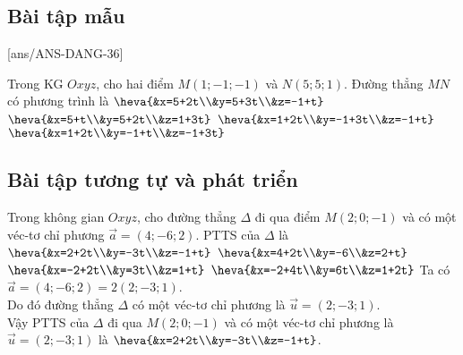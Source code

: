 \subsection{Bài tập mẫu}
[ans/ANS-DANG-36]
\begin{khung}
	\begin{vd}%
Trong KG $Oxyz$, cho hai điểm $M(1;-1;-1)$ và $N(5;5;1)$. Đường thẳng $MN$ có phương trình là
		\choice
		{$\heva{&x=5+2t\\&y=5+3t\\&z=-1+t}$}	
		{$\heva{&x=5+t\\&y=5+2t\\&z=1+3t}$}
		{\True $\heva{&x=1+2t\\&y=-1+3t\\&z=-1+t}$}	
		{$\heva{&x=1+2t\\&y=-1+t\\&z=-1+3t}$}
	\end{vd}
\end{khung}
\subsection{Bài tập tương tự và phát triển}
\begin{ex}%
	Trong không gian $O x y z$, cho đường thẳng $\Delta$ đi qua điểm $M(2;0;-1)$ và có một véc-tơ chỉ phương $\vec{a}=(4;-6;2)$. PTTS của $\Delta$ là 
	\choice 
	{\True $\heva{&x=2+2t\\&y=-3t\\&z=-1+t}$}
	{$\heva{&x=4+2t\\&y=-6\\&z=2+t}$}
	{$\heva{&x=-2+2t\\&y=3t\\&z=1+t}$}
	{$\heva{&x=-2+4t\\&y=6t\\&z=1+2t}$}
					\loigiai 
					{
Ta có $\vec{a}=(4;-6;2)=2(2;-3;1)$.\\
Do đó đường thẳng $\Delta$ có một véc-tơ chỉ phương là $\vec{u}=(2;-3;1)$.\\
Vậy PTTS của $\Delta$ đi qua $M(2;0;-1)$ và có một véc-tơ chỉ phương là $\vec{u}=(2;-3;1)$ là $\heva{&x=2+2t\\&y=-3t\\&z=-1+t}$.\\
					}
\end{ex}

